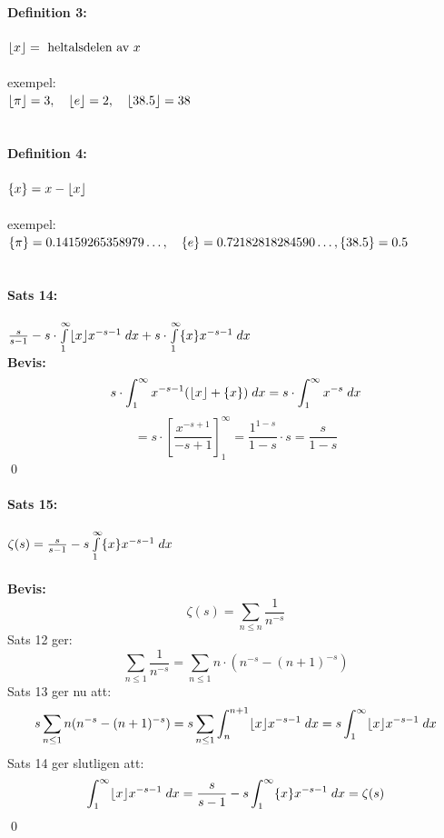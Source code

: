 \documentclass{article}%
\DeclarePairedDelimiter{\floor}{\lfloor}{\rfloor}
\DeclarePairedDelimiter{\fpart} { \{ } { \} }
\begin{document}
\paragraph{Definition 3:} $\floor{x} = \text{ heltalsdelen av } x$\\
\\
exempel:\\
$\floor{\pi} = 3, \quad \floor{e} = 2, \quad \floor{38.5} = 38$\\
\\
\paragraph{Definition 4:} $\fpart{x} = x - \floor{x}$\\
\\
exempel:\\
$\fpart{\pi} = 0.14159265358979 \ldots, \quad \fpart{e} = 0.72182818284590 \ldots, \fpart{38.5} = 0.5$\\
\\
\paragraph{Sats 14:} $\frac {s} {s - 1} - s \cdot \int\limits_1^\infty \floor{x} x^{-s - 1} \; dx +
		s \cdot \int\limits_1^\infty \fpart{x} x^{-s - 1} \; dx$ \\
{\bf Bevis:}\\
\[
	s \cdot \int_1^\infty x^{-s - 1} (\floor{x} + \fpart{x}) \; dx = s \cdot \int_1^\infty x^{-s} \; dx
\]
\[
	= s \cdot \left [
		\frac {x^{-s + 1}} {-s + 1}
	\right ]_1^\infty =
	\frac {1^{1 - s}} {1 - s} \cdot s = \frac {s} {1 - s}
\]
\hfill \qed
\\
\paragraph{Sats 15:} $\zeta(s) = \frac {s} {s - 1} - s \int\limits_1^\infty \fpart{x} x^{-s - 1} \; dx$\\
\\
{\bf Bevis:}\\
\[
	\zeta(s) = \sum_{n \leq n} \frac {1} {n^{-s}}
\]
Sats 12 ger:
\[
	\sum_{n \leq 1} \frac {1} {n^{-s}} = \sum_{n \leq 1} n \cdot (n^{-s} - (n + 1)^{-s})
\]
Sats 13 ger nu att:
\[
	s \sum_{n \leq 1} n (n^{-s} - (n + 1)^{-s}) = s \sum_{n \leq 1} \int_n^{n + 1} \floor{x} x^{-s -1} \; dx =
		s \int_1^\infty \floor{x} x^{-s - 1} \; dx
\]
Sats 14 ger slutligen att:
\[
	\int_1^\infty \floor{x} x^{-s - 1} \; dx = \frac {s} {s - 1} - s \int_1^\infty \fpart{x} x^{-s - 1} \; dx = \zeta(s)
\]
\hfill \qed
\\
\end{document}
